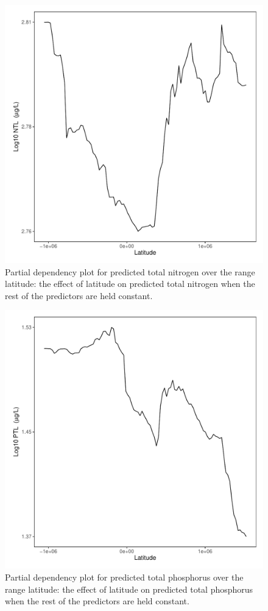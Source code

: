 \documentclass[fleqn,10pt,lineno]{wlpeerj} %
\begin{document}
\begin{figure}
  \includegraphics[scale=0.5]{PD_gisvs_N_Latitude.pdf}
  \caption{Partial dependency plot for predicted total nitrogen over the range latitude: the effect of latitude on predicted total nitrogen when the rest of the predictors are held constant.}
  \label{fig:PD_gisvs_N_Latitude}
\end{figure}

\begin{figure}
  \includegraphics[scale=0.5]{PD_gisvs_P_Latitude.pdf}
  \caption{Partial dependency plot for predicted total phosphorus over the range latitude: the effect of latitude on predicted total phosphorus when the rest of the predictors are held constant.}
  \label{fig:PD_gisvs_P_Latitude}
\end{figure}
\end{document}
